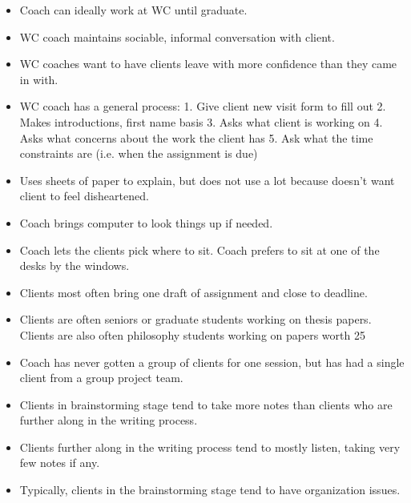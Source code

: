 \documentclass[12pt]{article} %
\begin{document}
  \begin{itemize}
     
    \item Coach can ideally work at WC until graduate.
     
    \item WC coach maintains sociable, informal conversation with client. 
     
    \item WC coaches want to have clients leave with more confidence than they came in with.
     
    \item WC coach has a general process:
    1.  	Give client new visit form to fill out
    2.  	Makes introductions, first name basis
    3.  	Asks what client is working on
    4.  	Asks what concerns about the work the client has
    5.  	Ask what the time constraints are (i.e. when the assignment is due)
     
    \item Uses sheets of paper to explain, but does not use a lot because doesn’t want client to feel disheartened.
     
    \item Coach brings computer to look things up if needed. 
     
    \item Coach lets the clients pick where to sit.  Coach prefers to sit at one of the desks by the windows.
     
    \item Clients most often bring one draft of assignment and close to deadline. 
     
    \item Clients are often seniors or graduate students working on thesis papers.  Clients are also often philosophy students working on papers worth 25%
     
    \item Coach has never gotten a group of clients for one session, but has had a single client from a group project team.
     
    \item Clients in brainstorming stage tend to take more notes than clients who are further along in the writing process. 
     
    \item Clients further along in the writing process tend to mostly listen, taking very few notes if any.
     
    \item Typically, clients in the brainstorming stage tend to have organization issues. 
     

\end{itemize}
\end{document}

